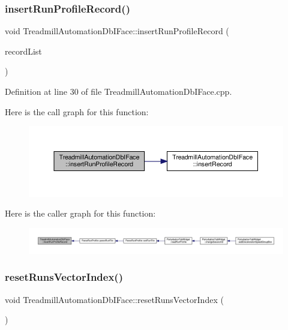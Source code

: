 \subsubsection{\texorpdfstring{insert\+Run\+Profile\+Record()}{insertRunProfileRecord()}}
{\footnotesize\ttfamily void Treadmill\+Automation\+Db\+I\+Face\+::insert\+Run\+Profile\+Record (\begin{DoxyParamCaption}\item[{Q\+String\+List}]{record\+List }\end{DoxyParamCaption})}



Definition at line 30 of file Treadmill\+Automation\+Db\+I\+Face.\+cpp.

Here is the call graph for this function\+:
\nopagebreak
\begin{figure}[H]
\begin{center}
\leavevmode
\includegraphics[width=350pt]{class_treadmill_automation_db_i_face_a2810ac6e2cb938a04c66f64d83c90d5f_cgraph}
\end{center}
\end{figure}
Here is the caller graph for this function\+:
\nopagebreak
\begin{figure}[H]
\begin{center}
\leavevmode
\includegraphics[width=350pt]{class_treadmill_automation_db_i_face_a2810ac6e2cb938a04c66f64d83c90d5f_icgraph}
\end{center}
\end{figure}
\mbox{\label{class_treadmill_automation_db_i_face_a2e1eb7dbfcfd5f83b841d9f925df5b56}} 
\subsubsection{\texorpdfstring{reset\+Runs\+Vector\+Index()}{resetRunsVectorIndex()}}
{\footnotesize\ttfamily void Treadmill\+Automation\+Db\+I\+Face\+::reset\+Runs\+Vector\+Index (\begin{DoxyParamCaption}{ }\end{DoxyParamCaption})}



